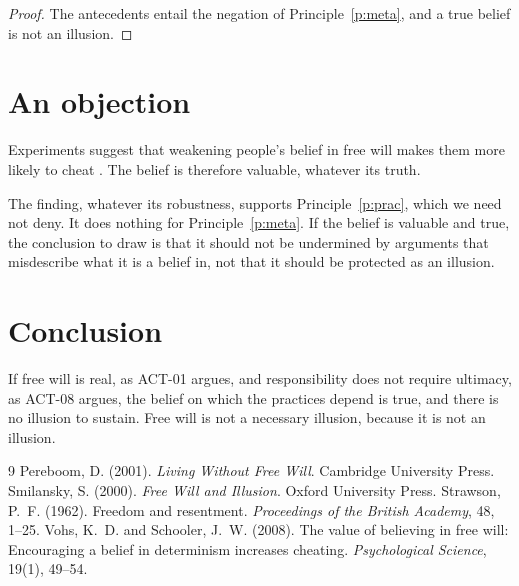 \documentclass{situationist-preprint}
\begin{document}
\begin{proof}
The antecedents entail the negation of Principle~\ref{p:meta}, and a true belief is not an illusion.
\end{proof}

\section{An objection}

\begin{objection}
Experiments suggest that weakening people's belief in free will makes them more likely to cheat \citep{VohsSchooler2008}. The belief is therefore valuable, whatever its truth.
\end{objection}

\begin{reply}
The finding, whatever its robustness, supports Principle~\ref{p:prac}, which we need not deny. It does nothing for Principle~\ref{p:meta}. If the belief is valuable and true, the conclusion to draw is that it should not be undermined by arguments that misdescribe what it is a belief in, not that it should be protected as an illusion.
\end{reply}

\section{Conclusion}

If free will is real, as ACT-01 argues, and responsibility does not require ultimacy, as ACT-08 argues, the belief on which the practices depend is true, and there is no illusion to sustain. Free will is not a necessary illusion, because it is not an illusion.

\begin{thebibliography}{9}\small
{} Pereboom, D. (2001). \emph{Living Without Free Will}. Cambridge University Press.
 Smilansky, S. (2000). \emph{Free Will and Illusion}. Oxford University Press.
 Strawson, P.~F. (1962). Freedom and resentment. \emph{Proceedings of the British Academy}, 48, 1--25.
 Vohs, K.~D. and Schooler, J.~W. (2008). The value of believing in free will: Encouraging a belief in determinism increases cheating. \emph{Psychological Science}, 19(1), 49--54.
\end{thebibliography}
\end{document}
